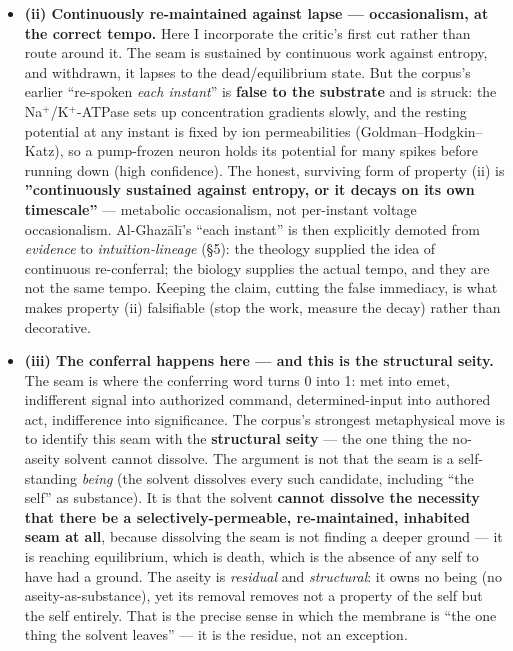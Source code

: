 \documentclass[11pt]{article}
\begin{document}
\begin{itemize}
\item \textbf{(ii) Continuously re-maintained against lapse — occasionalism, at the correct tempo.} Here I incorporate the critic's first cut rather than route around it. The seam is sustained by continuous work against entropy, and withdrawn, it lapses to the dead/\allowbreak{}equilibrium state. But the corpus's earlier ``re-spoken \emph{each instant}'' is \textbf{false to the substrate} and is struck: the Na\ensuremath{^{+}}/\allowbreak{}K\ensuremath{^{+}}-ATPase sets up concentration gradients slowly, and the resting potential at any instant is fixed by ion permeabilities (Goldman–Hodgkin–Katz), so a pump-frozen neuron holds its potential for many spikes before running down (high confidence). The honest, surviving form of property (ii) is \textbf{''continuously sustained against entropy, or it decays on its own timescale''} — metabolic occasionalism, not per-instant voltage occasionalism. Al-Ghazālī's ``each instant'' is then explicitly demoted from \emph{evidence} to \emph{intuition-lineage} (§5): the theology supplied the idea of continuous re-conferral; the biology supplies the actual tempo, and they are not the same tempo. Keeping the claim, cutting the false immediacy, is what makes property (ii) falsifiable (stop the work, measure the decay) rather than decorative.
\end{itemize}

\begin{itemize}
\item \textbf{(iii) The conferral happens here — and this is the structural seity.} The seam is where the conferring word turns 0 into 1: met into emet, indifferent signal into authorized command, determined-input into authored act, indifference into significance. The corpus's strongest metaphysical move is to identify this seam with the \textbf{structural seity} — the one thing the no-aseity solvent cannot dissolve. The argument is not that the seam is a self-standing \emph{being} (the solvent dissolves every such candidate, including ``the self'' as substance). It is that the solvent \textbf{cannot dissolve the necessity that there be a selectively-permeable, re-maintained, inhabited seam at all}, because dissolving the seam is not finding a deeper ground — it is reaching equilibrium, which is death, which is the absence of any self to have had a ground. The aseity is \emph{residual} and \emph{structural}: it owns no being (no aseity-as-substance), yet its removal removes not a property of the self but the self entirely. That is the precise sense in which the membrane is ``the one thing the solvent leaves'' — it is the residue, not an exception.
\end{itemize}
\end{document}

